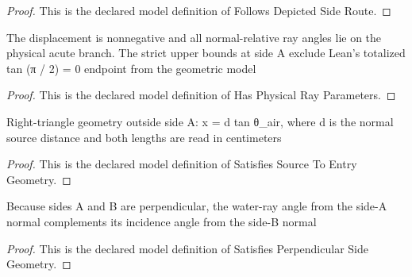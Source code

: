 \begin{proof}
  This is the declared model definition of Follows Depicted Side Route.
\end{proof}
\begin{definition}
  \label{def:physics:phyx-mini-0072:phyxminiproblems-problemphyxmini0072-hasphysicalrayparameters}
  The displacement is nonnegative and all normal-relative ray angles lie on the physical acute branch. The strict upper bounds at side A exclude Lean's totalized tan (π / 2) = 0 endpoint from the geometric model
\end{definition}
\begin{proof}
  This is the declared model definition of Has Physical Ray Parameters.
\end{proof}
\begin{definition}
  \label{def:physics:phyx-mini-0072:phyxminiproblems-problemphyxmini0072-satisfiessourcetoentrygeometry}
  Right-triangle geometry outside side A: x = d tan θ\_air, where d is the normal source distance and both lengths are read in centimeters
\end{definition}
\begin{proof}
  This is the declared model definition of Satisfies Source To Entry Geometry.
\end{proof}
\begin{definition}
  \label{def:physics:phyx-mini-0072:phyxminiproblems-problemphyxmini0072-satisfiesperpendicularsidegeometry}
  Because sides A and B are perpendicular, the water-ray angle from the side-A normal complements its incidence angle from the side-B normal
\end{definition}
\begin{proof}
  This is the declared model definition of Satisfies Perpendicular Side Geometry.
\end{proof}
